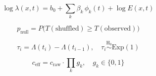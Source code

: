
\begin{equation}
\label{eq:intensity}
\log \lambda(x,t) = b_0 + \sum_{k} \beta_k \, \phi_k(t) + \log E(x,t)
\end{equation}

\begin{equation}
\label{eq:nulltest}
p_{\text{null}} = P\!\bigl(T(\text{shuffled}) \geq T(\text{observed})\bigr)
\end{equation}

\begin{equation}
\label{eq:trescaling}
\tau_i = \Lambda(t_i) - \Lambda(t_{i-1}), \quad \tau_i \overset{\text{H}_0}{\sim} \mathrm{Exp}(1)
\end{equation}

\begin{equation}
\label{eq:effconf}
c_{\text{eff}} = c_{\text{raw}} \cdot \prod_{k} g_k, \quad g_k \in \{0, 1\}
\end{equation}

